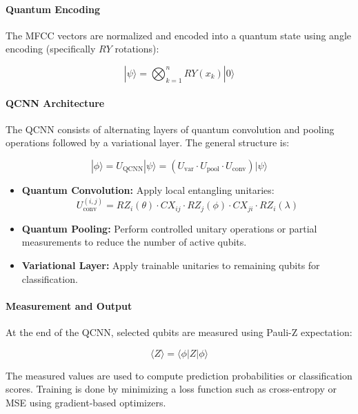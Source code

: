 \documentclass[conference]{IEEEtran}
\begin{document}
\paragraph{Quantum Encoding}

The MFCC vectors are normalized and encoded into a quantum state using angle encoding (specifically \( RY \) rotations):

\begin{equation}
|\psi\rangle = \bigotimes_{k=1}^{n} RY(x_k) |0\rangle
\end{equation}

\paragraph{QCNN Architecture}

The QCNN consists of alternating layers of quantum convolution and pooling operations followed by a variational layer. The general structure is:

\begin{equation}
|\phi\rangle = U_{\text{QCNN}} |\psi\rangle = (U_{\text{var}} \cdot U_{\text{pool}} \cdot U_{\text{conv}}) |\psi\rangle
\end{equation}

\begin{itemize}
    \item \textbf{Quantum Convolution:} Apply local entangling unitaries:
    \[
    U^{(i,j)}_{\text{conv}} = RZ_i(\theta) \cdot CX_{ij} \cdot RZ_j(\phi) \cdot CX_{ji} \cdot RZ_i(\lambda)
    \]
    \item \textbf{Quantum Pooling:} Perform controlled unitary operations or partial measurements to reduce the number of active qubits.
    \item \textbf{Variational Layer:} Apply trainable unitaries to remaining qubits for classification.
\end{itemize}

\paragraph{Measurement and Output}

At the end of the QCNN, selected qubits are measured using Pauli-Z expectation:

\begin{equation}
\langle Z \rangle = \langle \phi | Z | \phi \rangle
\end{equation}

The measured values are used to compute prediction probabilities or classification scores. Training is done by minimizing a loss function such as cross-entropy or MSE using gradient-based optimizers.



\end{document}
